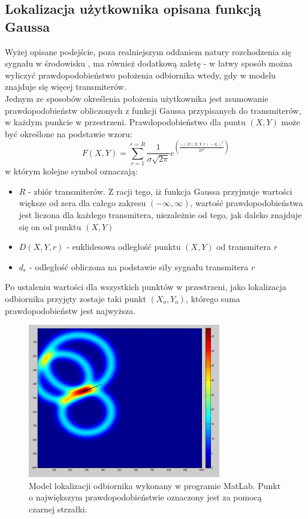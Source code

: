 \subsection{Lokalizacja użytkownika opisana funkcją Gaussa}
Wyżej opisane podejście, poza realniejszym oddaniem natury rozchodzenia się sygnału w środowisku \cite{TDECHN}, ma również dodatkową zaletę - w łatwy sposób można wyliczyć prawdopodobieństwo położenia odbiornika wtedy, gdy w modelu znajduje się więcej transmiterów.\\
Jednym ze sposobów określenia położenia użytkownika jest zsumowanie prawdopodobieństw obliczonych z funkcji Gaussa przypisanych do transmiterów, w każdym punkcie w przestrzeni. Prawdopodobieństwo dla puntu $(X,Y)$ może być określone na podstawie wzoru:
\begin{equation}
F(X,Y) = \sum_{r=1}^{r=R} \frac{1}{\sigma\sqrt{2\pi}}e^{\left(\frac{-(D(X,Y,r)-d_r)^2}{2\sigma^2}\right)}
\end{equation}
w którym kolejne symbol oznaczają:
\begin{itemize}
	\item $R$ - zbiór transmiterów. Z racji tego, iż funkcja Gaussa przyjmuje wartości większe od zera dla całego zakresu $(-\infty,\infty)$, wartość prawdopodobieństwa jest liczona dla każdego transmitera, niezależnie od tego, jak daleko znajduje się on od punktu $(X,Y)$
	\item $D(X,Y,r)$ - euklidesowa odległość punktu $(X,Y)$ od transmitera $r$
	\item $d_r$ - odległość obliczona na podstawie siły sygnału transmitera $r$
\end{itemize}
Po ustaleniu wartości dla wszystkich punktów w przestrzeni, jako lokalizacja odbiornika przyjęty zostaje taki punkt $(X_o,Y_o)$, którego suma prawdopodobieństw jest najwyższa.
\begin{figure}[H]			
	\centering
	\caption{Model lokalizacji odbiornika wykonany w programie MatLab. Punkt o największym prawdopodobieństwie oznaczony jest za pomocą czarnej strzałki.}
	\includegraphics[width=0.75\textwidth]{guasianRouter}
\end{figure}
